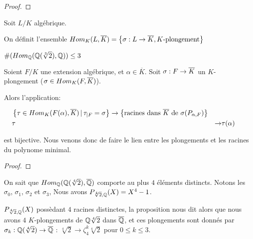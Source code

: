 \ifdefined\outputproof
\begin{proof}

\end{proof}
\fi

\begin{definition}
	Soit $L/K$ algébrique.

	On définit l'ensemble $Hom_{K}(L, \overline{K}) =
	\left\{ \sigma : L \rightarrow \overline{K}, \text{$K$-plongement} \right\}$
\end{definition}

\begin{exemple}
	$\#(Hom_{\mathbb{Q}}(\mathbb{Q}(\sqrt[3]{2}), \mathbb{Q})) \leq 3$
\end{exemple}


\begin{proposition}
	Soient $F/K$ une extension algébrique, et $\alpha \in \overline{K}$.
	Soit $\sigma : F \rightarrow \overline{K}$ un $K$-plongement ($\sigma \in
	Hom_{K}(F, \overline{K})$).

	Alors l'application:

	\begin{align*}
		& \left\{\tau \in Hom_{K}(F(\alpha), \overline{K}) \, | \, \tau_{|F} =
		\sigma \right\} \rightarrow \left\{ \text{racines dans $\overline{K}$ de
		$\sigma(P_{\alpha, F})$} \right\} \\
		& \tau &\rightarrow& \tau(\alpha)
	\end{align*}

	est bijective. Nous venons donc de faire le lien entre les plongements et
	les racines du polynome minimal.
\end{proposition}

\ifdefined\outputproof
\begin{proof}

\end{proof}
\fi

\begin{exemple}
	On sait que
	$Hom_{\mathbb{Q}}(\mathbb{Q}(\sqrt[4]{2}), \overline{\mathbb{Q}})$
	comporte au plus $4$ éléments distincts. Notons les $\sigma_{0}$, $\sigma_{1}$,
	$\sigma_{2}$ et $\sigma_{3}$,
	Nous avons $P_{\sqrt[4]{2}, \mathbb{Q}}(X) = X^{4} - 1$.

	$P_{\sqrt[4]{2}, \mathbb{Q}}(X)$ possèdant $4$ racines distinctes, la
	proposition nous dit alors que nous avons $4$
	$K$-plongements de $\mathbb{Q}{\sqrt[4]{2}}$ dans $\overline{\mathbb{Q}}$, et
	ces plongements sont donnés par
	$\sigma_{k} : \mathbb{Q}(\sqrt[4]{2}) \rightarrow \overline{\mathbb{Q}}$ :
	$\sqrt[4]{2} \rightarrow \zeta^{k}_{4} \sqrt[4]{2}$ pour $0 \leq k \leq 3$.
\end{exemple}

